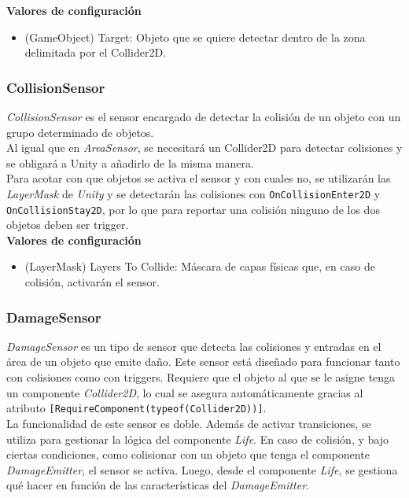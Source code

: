 \textbf{Valores de configuración}
\begin{itemize}
	\item (GameObject) Target: Objeto que se quiere detectar dentro de la zona delimitada por el Collider2D.
\end{itemize}

\subsubsection{CollisionSensor}

\textit{CollisionSensor} es el sensor encargado de detectar la colisión de un objeto con un grupo determinado de objetos.\\

Al igual que en \textit{AreaSensor}, se necesitará un Collider2D para detectar colisiones y se obligará a Unity a añadirlo de la misma manera.\\

Para acotar con que objetos se activa el sensor y con cuales no, se utilizarán las \textit{LayerMask} de \textit{Unity} y se detectarán las colisiones con \texttt{OnCollisionEnter2D} y \texttt{OnCollisionStay2D}, por lo que para reportar una colisión ninguno de los dos objetos deben ser trigger.\\

\textbf{Valores de configuración}
\begin{itemize}
	\item (LayerMask) Layers To Collide: Máscara de capas físicas que, en caso de colisión, activarán el sensor.
\end{itemize}

\subsubsection{DamageSensor}

\textit{DamageSensor} es un tipo de sensor que detecta las colisiones y entradas en el área de un objeto que emite daño. Este sensor está diseñado para funcionar tanto con colisiones como con triggers. Requiere que el objeto al que se le asigne tenga un componente \textit{Collider2D}, lo cual se asegura automáticamente gracias al atributo \texttt{[RequireComponent(typeof(Collider2D))]}.\\

La funcionalidad de este sensor es doble. Además de activar transiciones, se utiliza para gestionar la lógica del componente \textit{Life}. En caso de colisión, y bajo ciertas condiciones, como colisionar con un objeto que tenga el componente \textit{DamageEmitter}, el sensor se activa. Luego, desde el componente \textit{Life}, se gestiona qué hacer en función de las características del \textit{DamageEmitter}.\\

